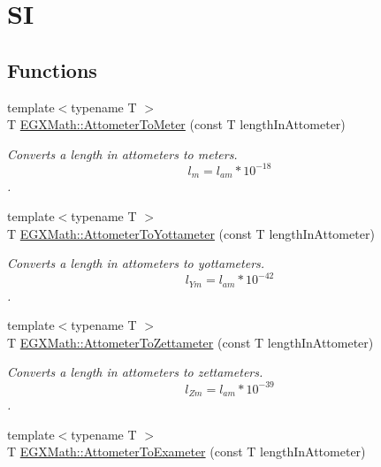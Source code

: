 \hypertarget{group___e_g_x_math-_conversions-_length_conversions-_attometer-_s_i}{}\section{SI}
\label{group___e_g_x_math-_conversions-_length_conversions-_attometer-_s_i}
\subsection*{Functions}
\begin{DoxyCompactItemize}
\item 
{\footnotesize template$<$typename T $>$ }\\T \mbox{\hyperlink{group___e_g_x_math-_conversions-_length_conversions-_attometer-_s_i_gaa987cce911ce54c3022444537c705b97}{E\+G\+X\+Math\+::\+Attometer\+To\+Meter}} (const T length\+In\+Attometer)
\begin{DoxyCompactList}\small\item\em Converts a length in attometers to meters. \[ l_{m}=l_{am}* 10^{-18} \]. \end{DoxyCompactList}\item 
{\footnotesize template$<$typename T $>$ }\\T \mbox{\hyperlink{group___e_g_x_math-_conversions-_length_conversions-_attometer-_s_i_gaaa5d4078879169021c8f2857c02a7aed}{E\+G\+X\+Math\+::\+Attometer\+To\+Yottameter}} (const T length\+In\+Attometer)
\begin{DoxyCompactList}\small\item\em Converts a length in attometers to yottameters. \[ l_{Ym}=l_{am} * 10^{-42} \]. \end{DoxyCompactList}\item 
{\footnotesize template$<$typename T $>$ }\\T \mbox{\hyperlink{group___e_g_x_math-_conversions-_length_conversions-_attometer-_s_i_ga64b586463e4d2d7bbc63e43e8205383b}{E\+G\+X\+Math\+::\+Attometer\+To\+Zettameter}} (const T length\+In\+Attometer)
\begin{DoxyCompactList}\small\item\em Converts a length in attometers to zettameters. \[ l_{Zm}=l_{am} * 10^{-39} \]. \end{DoxyCompactList}\item 
{\footnotesize template$<$typename T $>$ }\\T \mbox{\hyperlink{group___e_g_x_math-_conversions-_length_conversions-_attometer-_s_i_gaca9be6820446effaa50024d2ccc3eea8}{E\+G\+X\+Math\+::\+Attometer\+To\+Exameter}} (const T length\+In\+Attometer)

\end{DoxyCompactItemize}
